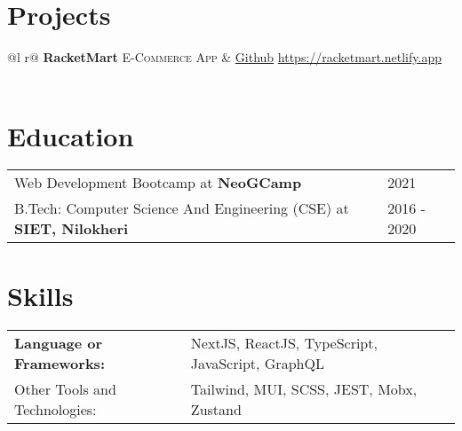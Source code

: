 \documentclass[a4paper,12pt]{article}
\begin{document}
\section{Projects}

\begin{tabularx}{\linewidth}{ @{}l r@{} }
\textbf{RacketMart} \textsc{E-Commerce App} &  \href{https://github.com/AnkitKarnAK/racketmart-ecommerce}{Github}  \hfill \href{https://racketmart.netlify.app}{https://racketmart.netlify.app} \\[3.75pt]
  \\
\end{tabularx}

\section{Education}
\begin{tabularx}{\linewidth}{@{}l X@{}}	
Web Development Bootcamp at \textbf{NeoGCamp} & \hfill 2021 \\
B.Tech: 
Computer Science And 
Engineering (CSE) at \textbf{SIET, Nilokheri} & \hfill 2016 - 2020 \\ 
\end{tabularx}


\section{Skills}
\begin{tabularx}{\linewidth}{@{}l X@{}}
\textbf{Language or Frameworks:} &  \normalsize{NextJS, ReactJS, TypeScript, JavaScript, GraphQL}\\
Other Tools and Technologies:  &  \normalsize{Tailwind, MUI, SCSS, JEST, Mobx, Zustand}\\ 
\end{tabularx}

\vfill
{}
\end{document}

